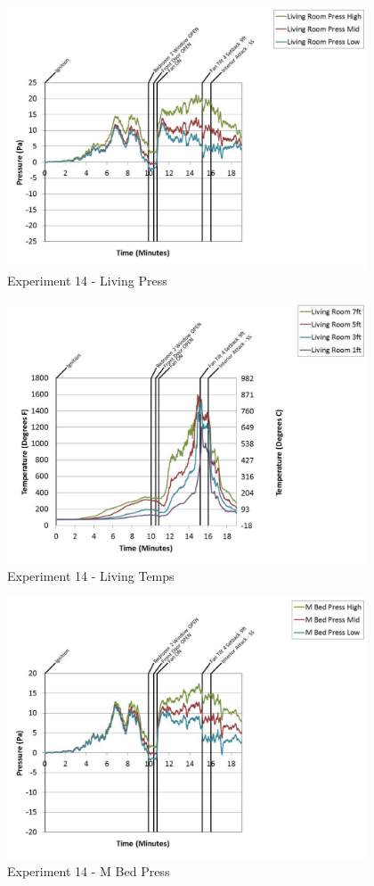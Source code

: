 \documentclass{article}
\begin{document}
\begin{appendices}
	\clearpage

	\begin{figure}[h!]
		\centering
		\includegraphics[height=3.05in]{0_Images/Results_Charts/Exp_14_Charts/LivingPress.pdf}
		\caption{Experiment 14 - Living Press}
	\end{figure}
 

	\begin{figure}[h!]
		\centering
		\includegraphics[height=3.05in]{0_Images/Results_Charts/Exp_14_Charts/LivingTemps.pdf}
		\caption{Experiment 14 - Living Temps}
	\end{figure}
 
	\clearpage

	\begin{figure}[h!]
		\centering
		\includegraphics[height=3.05in]{0_Images/Results_Charts/Exp_14_Charts/MBedPress.pdf}
		\caption{Experiment 14 - M Bed Press}
	\end{figure}
 


\end{appendices}
\end{document}
